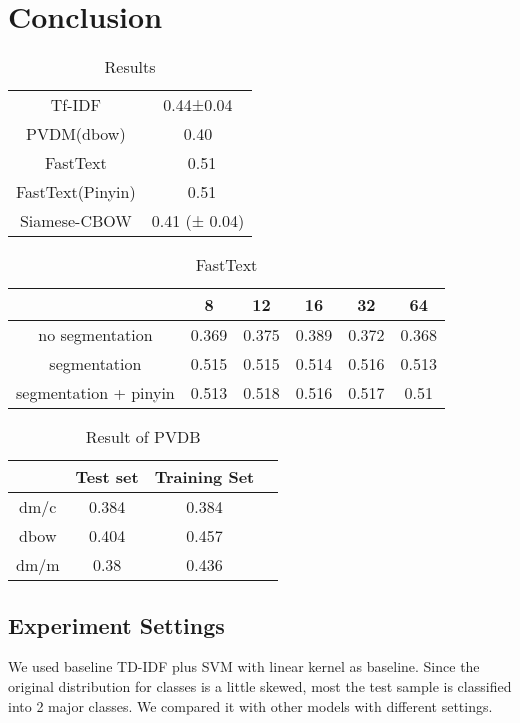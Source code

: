 \chapter{Conclusion}

\begin{table}[]
\centering
\caption{Results}
\label{resultAll}
\begin{tabular}{|c|c|}
\hline
Tf-IDF   & 0.44±0.04 \\
PVDM(dbow) & 0.40    \\
FastText &  ~0.51   \\
FastText(Pinyin) &  ~0.51  \\
Siamese-CBOW & 0.41 (± 0.04) \\
\hline
\end{tabular}
\end{table}

\begin{table}[]
\centering
\caption{FastText}
\label{fasttext}
\begin{tabular}{|c|c|c|c|c|c|}
\hline
   & 8 & 12 & 16 & 32 & 64 \\
\hline
no segmentation  & 0.369 & 0.375 & 0.389 & 0.372 & 0.368 \\
segmentation  & 0.515 & 0.515 & 0.514 & 0.516 & 0.513 \\
segmentation + pinyin  & 0.513 & 0.518 & 0.516 & 0.517 & 0.51 \\
\hline
\end{tabular}
\end{table}

\begin{table}[]
\centering
\caption{Result of PVDB}
\label{resultAll}
\begin{tabular}{|c|c|c|c|}
\hline
      & Test set & Training Set \\
\hline
dm/c  & 0.384 &  0.384 \\
dbow &  0.404  & 0.457 \\
dm/m &  0.38  & 0.436 \\
\hline
\end{tabular}
\end{table}


\section{Experiment Settings}


We used baseline TD-IDF plus SVM with linear kernel as baseline. 
Since the original distribution for classes is a little skewed, most the test sample is classified into 2 major classes.
We compared it with other models with different settings. \\

